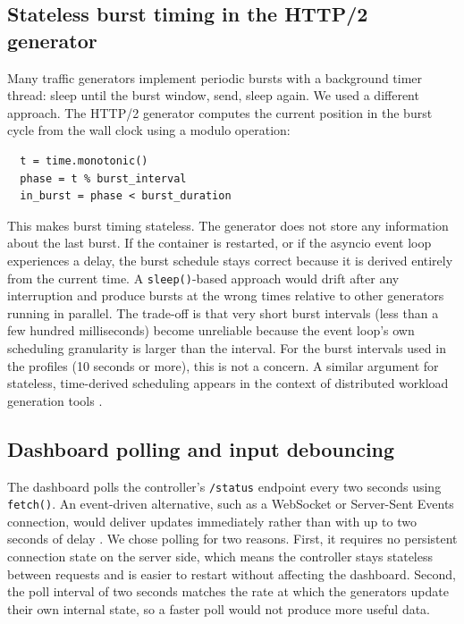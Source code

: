 \subsection{Stateless burst timing in the HTTP/2 generator}

Many traffic generators implement periodic bursts with a background timer
thread: sleep until the burst window, send, sleep again. We used a different
approach. The HTTP/2 generator computes the current position in the burst
cycle from the wall clock using a modulo operation:

\begin{verbatim}
  t = time.monotonic()
  phase = t % burst_interval
  in_burst = phase < burst_duration
\end{verbatim}

This makes burst timing stateless. The generator does not store any
information about the last burst. If the container is restarted, or if
the asyncio event loop experiences a delay, the burst schedule stays
correct because it is derived entirely from the current time. A
\texttt{sleep()}-based approach would drift after any interruption
and produce bursts at the wrong times relative to other generators
running in parallel. The trade-off is that very short burst intervals
(less than a few hundred milliseconds) become unreliable because the
event loop's own scheduling granularity is larger than the interval.
For the burst intervals used in the profiles (10 seconds or more),
this is not a concern. A similar argument for stateless, time-derived
scheduling appears in the context of distributed workload generation
tools \cite{ditg}.

\subsection{Dashboard polling and input debouncing}

The dashboard polls the controller's \texttt{/status} endpoint every two
seconds using \texttt{fetch()}. An event-driven alternative, such as a
WebSocket or Server-Sent Events connection, would deliver updates
immediately rather than with up to two seconds of delay
\cite{rfc6455}. We chose polling for two reasons. First, it requires no
persistent connection state on the server side, which means the controller
stays stateless between requests and is easier to restart without
affecting the dashboard. Second, the poll interval of two seconds matches
the rate at which the generators update their own internal state, so a
faster poll would not produce more useful data.

